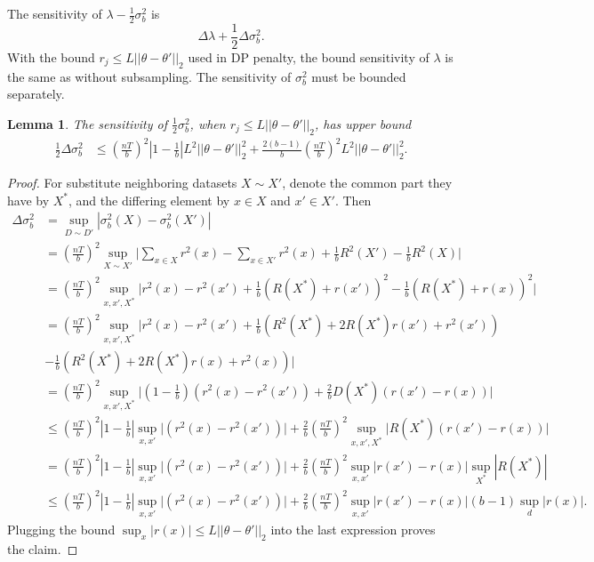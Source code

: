\documentclass[english,twoside,openright]{HYgraduMLDS}
\newtheorem{lemma}{Lemma}
\begin{document}
The sensitivity of \(\lambda - \frac{1}{2}\sigma_b^2\) is 
\[
    \Delta \lambda + \frac{1}{2}\Delta \sigma_b^2.
\]
With the bound \(r_j \leq L||\theta - \theta'||_2\) used in DP penalty, the 
bound sensitivity of \(\lambda\) is the same as without subsampling.
The sensitivity of \(\sigma_b^2\) must be bounded separately.
\begin{lemma}\label{variance_sensitivity_lemma}
    The sensitivity of \(\frac{1}{2}\sigma_b^2\), 
    when \(r_j \leq L||\theta - \theta'||_2\), has upper bound
    \begin{align*}
        \frac{1}{2}\Delta \sigma_b^2
        &\leq \left(\frac{nT}{b}\right)^2 \left|1 - \frac{1}{b}\right|
        L^2||\theta - \theta'||_2^2
        + \frac{2(b - 1)}{b}\left(\frac{nT}{b}\right)^2 L^2||\theta - \theta'||^2_2.
    \end{align*}
\end{lemma}
\begin{proof}
    For substitute neighboring datasets \(X \sim X'\), denote the
    common part they have by \(X^*\), and the differing element by \(x\in X\) 
    and \(x'\in X'\). Then
    \begin{align*}
        \Delta \sigma^2_b &= \sup_{D\sim D'} |\sigma^2_b(X) - \sigma^2_b(X')|
        \\&= \left(\frac{nT}{b}\right)^2 \sup_{X\sim X'}\Big|
        \sum_{x\in X}r^2(x) - \sum_{x\in X'}r^2(x)
        + \frac{1}{b}R^2(X') - \frac{1}{b}R^2(X)\Big|
        \\&= \left(\frac{nT}{b}\right)^2 \sup_{x, x', X^*}\Big|
        r^2(x) - r^2(x')
        + \frac{1}{b}(R(X^*) + r(x'))^2 - \frac{1}{b}(R(X^*) + r(x))^2\Big|
        \\&= \left(\frac{nT}{b}\right)^2 \sup_{x, x', X^*}\Big|
        r^2(x) - r^2(x')
        + \frac{1}{b}(R^2(X^*) + 2R(X^*)r(x') + r^2(x'))
        \\&- \frac{1}{b}(R^2(X^*) + 2R(X^*)r(x) + r^2(x))\Big|
        \\&= \left(\frac{nT}{b}\right)^2 \sup_{x, x', X^*}\Big|
        \left(1 - \frac{1}{b}\right)(r^2(x) - r^2(x'))
        + \frac{2}{b}D(X^*)(r(x') - r(x))\Bigg|
        \\&\leq \left(\frac{nT}{b}\right)^2 \left|1 - \frac{1}{b}\right|
        \sup_{x, x'}\Big|(r^2(x) - r^2(x'))\Big|
        + \frac{2}{b}\left(\frac{nT}{b}\right)^2 \sup_{x, x', X^*}\Big|
        R(X^*)(r(x') - r(x))\Bigg|
        \\&= \left(\frac{nT}{b}\right)^2 \left|1 - \frac{1}{b}\right|
        \sup_{x, x'}\Big|(r^2(x) - r^2(x'))\Big|
        + \frac{2}{b}\left(\frac{nT}{b}\right)^2
        \sup_{x, x'}|r(x') - r(x)|
        \sup_{X^*}|R(X^*)|
        \\&\leq \left(\frac{nT}{b}\right)^2 \left|1 - \frac{1}{b}\right|
        \sup_{x, x'}\Big|(r^2(x) - r^2(x'))\Big|
        + \frac{2}{b}\left(\frac{nT}{b}\right)^2
        \sup_{x, x'}|r(x') - r(x)|(b - 1)\sup_{d}|r(x)|.
    \end{align*}
    Plugging the bound \(\sup_x |r(x)| \leq L||\theta - \theta'||_2\) 
    into the last expression proves the claim.
\end{proof}
\end{document}
